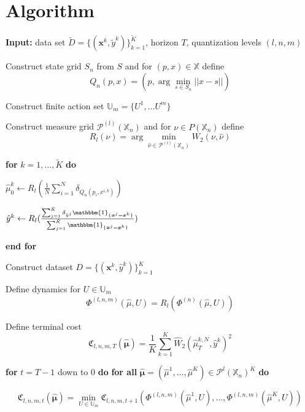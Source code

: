\documentclass{article}
\begin{document}
\newpage

\section{Algorithm}


\begin{algorithm}
\caption{Next Token Prediction with Dynamic Programming}
\begin{algorithmic}[1]

\State \textbf{Input:} data set $\tilde D = \{(\bm x ^k, \tilde y^k)\}_{k=1}^ {\tilde K}$, horizon $T$, quantization levels $(l, n, m)$

\State Construct state grid $S_n$ from $S$ and for $(p,x) \in \mathbb X$ define 
$$Q_n(p, x) = (p, \arg \min_{s \in S_n}||x-s||)$$

\State Construct finite action set $\mathbb U_m = \{U^1, \dots U^m\}$

\State Construct measure grid $\mathcal P^{(l)} (\mathbb X_n)$ and for $\nu \in P(\mathbb X_n)$ define 
$$R_l(\nu)  = \arg \min _{\hat \nu \in \mathcal P^{(l)} (\mathbb X_n)} W_2(\nu, \hat \nu)$$

\State \textbf{for} $k = 1, \dots , \tilde K$ \textbf{do}

\State \quad $\hat \mu_0^k \leftarrow R_l (\frac{1}{N}\sum _{i=1}^N\delta_{Q_n(p_i, x^{i,k})})$

\State \quad $\hat y^k \leftarrow R_l( {\frac{
\sum_{j=1}^{\tilde {K}} \delta _ {\tilde y^j} \mathbbm{1}_{\{\bm{x}^j = \bm{x}^k\}}}{\sum_{j=1}^{\tilde {K}} \mathbbm{1}_{\{\bm{x}^j = \bm{x}^k\}}}})$

\State \textbf{end for}

\State Construct dataset $D = \{(\bm x ^k, \hat y^k)\}_{k=1}^K$ 

\State Define dynamics for $U \in \mathbb U _m$
$$\Phi ^{(l, n, m)}(\hat \mu, U) = R_l(\Phi^{(n)}(\hat \mu, U))$$

\State Define terminal cost $$\mathfrak C _ {l, n, m, T} (\hat {\bm \mu}) = \frac{1}{K}\sum _{k = 1}^K \hat W_{2}(\hat \mu^{k, N}_T ,\hat y^k)^2$$

\State \textbf{for} $t = T-1$ down to $0$ \textbf{do}
\State \quad \textbf{for all} $\hat{\bm \mu} = (\hat \mu ^1, \dots , \hat \mu ^K) \in \mathcal P^l(\mathbb X_n)^K$ \textbf{do} 

\State \quad \quad 
$$\mathfrak C _ {l, n, m, t} (\hat {\bm \mu}) = \min_{U \in \mathbb U_m} \mathfrak C _ {l, n, m, t+1} (\Phi ^{(l, n, m)}(\hat {\mu}^1, U), \dots ,\Phi ^{(l, n, m)}(\hat {\mu}^K, U))$$


\end{algorithmic}
\end{algorithm}
\end{document}
